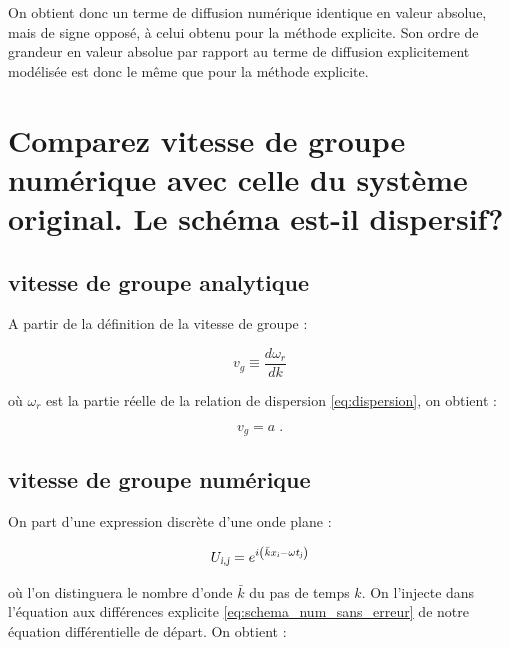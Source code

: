 \documentclass[a4paper, 12pt]{report}
\begin{document}
On obtient donc un terme de diffusion numérique identique en valeur absolue,
mais de signe opposé, à celui obtenu pour la méthode explicite. Son ordre
de grandeur en valeur absolue par rapport au terme de diffusion explicitement
modélisée est donc le même que pour la méthode explicite. %


\section{Comparez vitesse de groupe numérique avec celle du système original. Le schéma est-il dispersif?}

\subsection*{vitesse de groupe analytique}

A partir de la définition de la vitesse de groupe :

\begin{equation}
 v_{g} \equiv \frac{d\omega_{r}}{dk}
\end{equation}

où $\omega_{r}$ est la partie réelle de la relation de dispersion \eqref{eq:dispersion}, on obtient :

\begin{equation}
 v_{g} = a\;.
\end{equation}

\subsection*{vitesse de groupe numérique}

On part d'une expression discrète d'une onde plane :

\begin{equation}
  U_{\textsl{i},\textsl{j}} = e^{i\left(\bar{k}x_{\textsl{i}}-\omega t_{\textsl{j}}\right)}
\end{equation}

où l'on distinguera le nombre d'onde $\bar{k}$ du pas de temps $k$. On l'injecte dans l'équation aux différences explicite \eqref{eq:schema_num_sans_erreur} de notre équation différentielle de départ. On obtient :
\end{document}
